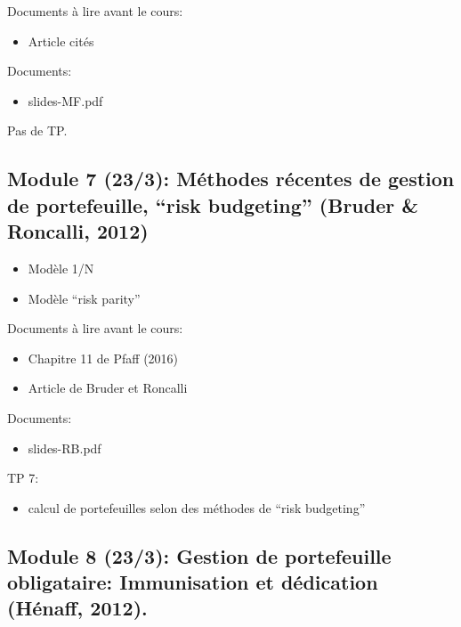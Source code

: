 \documentclass[
  11pt,
]{article}
\providecommand{\tightlist}{%
  \setlength{\itemsep}{0pt}\setlength{\parskip}{0pt}}
\begin{document}
Documents à lire avant le cours:

\begin{itemize}
\tightlist
\item
  Article cités
\end{itemize}

Documents:

\begin{itemize}
\tightlist
\item
  slides-MF.pdf
\end{itemize}

Pas de TP.

\hypertarget{module-7-233-muxe9thodes-ruxe9centes-de-gestion-de-portefeuille-risk-budgeting-bruder2012}{%
\subsection{Module 7 (23/3): Méthodes récentes de gestion de
portefeuille, ``risk budgeting'' (Bruder \& Roncalli,
2012)}\label{module-7-233-muxe9thodes-ruxe9centes-de-gestion-de-portefeuille-risk-budgeting-bruder2012}}

\begin{itemize}
\tightlist
\item
  Modèle 1/N
\item
  Modèle ``risk parity''
\end{itemize}

Documents à lire avant le cours:

\begin{itemize}
\tightlist
\item
  Chapitre 11 de Pfaff (2016)
\item
  Article de Bruder et Roncalli
\end{itemize}

Documents:

\begin{itemize}
\tightlist
\item
  slides-RB.pdf
\end{itemize}

TP 7:

\begin{itemize}
\tightlist
\item
  calcul de portefeuilles selon des méthodes de ``risk budgeting''
\end{itemize}

\hypertarget{module-8-233-gestion-de-portefeuille-obligataire-immunisation-et-duxe9dication-henaff2012.}{%
\subsection{Module 8 (23/3): Gestion de portefeuille obligataire:
Immunisation et dédication (Hénaff,
2012).}\label{module-8-233-gestion-de-portefeuille-obligataire-immunisation-et-duxe9dication-henaff2012.}}
\end{document}
